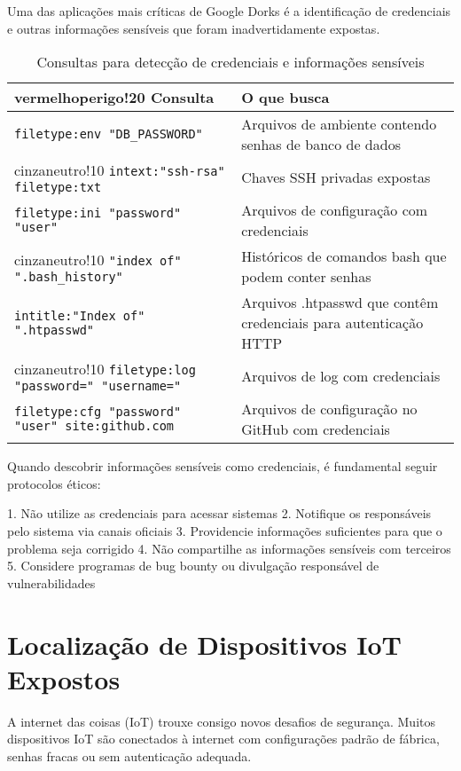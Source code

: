 \documentclass[12pt,a4paper]{book}
\begin{document}
Uma das aplicações mais críticas de Google Dorks é a identificação de credenciais e outras informações sensíveis que foram inadvertidamente expostas.

\begin{table}[h]
\centering
\begin{tabular}{|p{8cm}|p{7cm}|}
\hline
{vermelhoperigo!20} \textbf{Consulta} & \textbf{O que busca} \\
\hline
\texttt{filetype:env "DB\_PASSWORD"} & Arquivos de ambiente contendo senhas de banco de dados \\
\hline
{cinzaneutro!10} \texttt{intext:"ssh-rsa" filetype:txt} & Chaves SSH privadas expostas \\
\hline
\texttt{filetype:ini "password" "user"} & Arquivos de configuração com credenciais \\
\hline
{cinzaneutro!10} \texttt{"index of" ".bash\_history"} & Históricos de comandos bash que podem conter senhas \\
\hline
\texttt{intitle:"Index of" ".htpasswd"} & Arquivos .htpasswd que contêm credenciais para autenticação HTTP \\
\hline
{cinzaneutro!10} \texttt{filetype:log "password=" "username="} & Arquivos de log com credenciais \\
\hline
\texttt{filetype:cfg "password" "user" site:github.com} & Arquivos de configuração no GitHub com credenciais \\
\hline
\end{tabular}
\caption{Consultas para detecção de credenciais e informações sensíveis}
\end{table}

\begin{tipbox}
Quando descobrir informações sensíveis como credenciais, é fundamental seguir protocolos éticos:

1. Não utilize as credenciais para acessar sistemas
2. Notifique os responsáveis pelo sistema via canais oficiais
3. Providencie informações suficientes para que o problema seja corrigido
4. Não compartilhe as informações sensíveis com terceiros
5. Considere programas de bug bounty ou divulgação responsável de vulnerabilidades
\end{tipbox}

\section{Localização de Dispositivos IoT Expostos}

A internet das coisas (IoT) trouxe consigo novos desafios de segurança. Muitos dispositivos IoT são conectados à internet com configurações padrão de fábrica, senhas fracas ou sem autenticação adequada.
\end{document}
